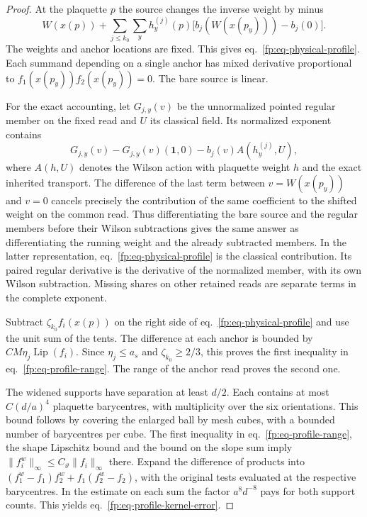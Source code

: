 \documentclass[11pt,letterpaper,reqno]{amsart}
\numberwithin{equation}{section}
\renewcommand{\eqref}[1]{\textup{eq.~\ref{#1}}}
\theoremstyle{definition}
\theoremstyle{remark}
\begin{document}
\begin{proof}
At the plaquette \(p\) the source changes the inverse weight by
minus
\[
 W(x(p))+\sum_{j\le k_0}\sum_y h_y^{(j)}(p)
             \bigl[b_j(W(x(p_y)))-b_j(0)\bigr].
\]
The weights and anchor locations are fixed. This gives
\eqref{fp:eq-physical-profile}. Each summand depending on a
single anchor has mixed derivative proportional to
\(f_1(x(p_y))f_2(x(p_y))=0\). The bare source is linear.

For the exact accounting, let \(G_{j,y}(v)\) be the unnormalized
pointed regular member on the fixed read and \(U\) its classical
field. Its normalized exponent contains
\[
 G_{j,y}(v)-G_{j,y}(v)(\mathbf1,0)
                    -b_j(v)A(h_y^{(j)},U),
\]
where \(A(h,U)\) denotes the Wilson action with plaquette weight
\(h\) and the exact inherited transport. The difference of the
last term between \(v=W(x(p_y))\) and \(v=0\) cancels precisely
the contribution of the same coefficient to the shifted weight
on the common read. Thus differentiating the bare source and
the regular members before their Wilson subtractions gives the
same answer as differentiating the running weight and the
already subtracted members. In the latter representation,
\eqref{fp:eq-physical-profile} is the classical contribution.
Its paired regular derivative is the derivative of the
normalized member, with its own Wilson subtraction. Missing
shares on other retained reads are separate terms in the
complete exponent.

Subtract \(\zeta_{k_0} f_i(x(p))\) on the right side of
\eqref{fp:eq-physical-profile} and use the unit sum of the tents.
The difference at each anchor is bounded by
\(CM\eta_j\operatorname{Lip}(f_i)\). Since \(\eta_j\le a_s\)
and \(\zeta_{k_0}\ge2/3\), this proves the first inequality in
\eqref{fp:eq-profile-range}. The range of the anchor read proves
the second one.

The widened supports have separation at least \(d/2\). Each
contains at most \(C(d/a)^4\) plaquette barycentres, with
multiplicity over the six orientations. This bound follows
by covering the enlarged ball by mesh cubes, with a bounded
number of barycentres per cube. The first inequality in
\eqref{fp:eq-profile-range}, the shape Lipschitz bound and the
bound on the slope sum imply \(\|f_i^w\|_\infty\le C_\vartheta
\|f_i\|_\infty\) there. Expand the difference of products into
\((f_1^w-f_1)f_2^w+f_1(f_2^w-f_2)\), with the original tests
evaluated at the respective barycentres. In the estimate on
each sum the factor \(a^8d^{-8}\) pays for both support
counts. This yields \eqref{fp:eq-profile-kernel-error}.
\end{proof}
\end{document}
